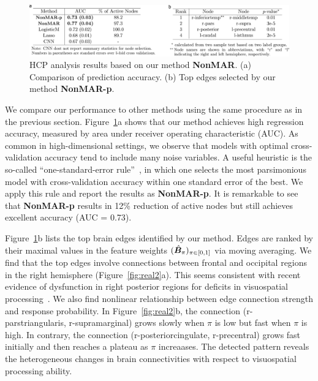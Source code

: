 \documentclass[11pt]{article}
\theoremstyle{plain}
\theoremstyle{definition}
\begin{document}
\begin{figure}[ht]
    \centering
       \includegraphics[width=\textwidth]{braintable.pdf}
 \caption{HCP analysis results based on our method {\bf \small NonMAR}. (a) Comparison of prediction accuracy. (b) Top edges selected by our method {\small \bf NonMAR-p}. }\label{fig:real}
\end{figure}

We compare our performance to other methods using the same procedure as in the previous section. Figure~\ref{fig:real}a shows that our method achieves high regression accuracy, measured by area under receiver operating characteristic (AUC). As common in high-dimensional settings, we observe that models with optimal cross-validation accuracy tend to include many noise variables. A useful heuristic is the so-called ``one-standard-error rule''~\citep{hastie2015statistical}, in which one selects the most parsimonious model with cross-validation accuracy within one standard error of the best. We apply this rule and report the results as {\bf \small NonMAR-p}. It is remarkable to see that {\bf \small NonMAR-p} results in 12\% reduction of active nodes but still achieves excellent accuracy (AUC = 0.73). 


Figure~\ref{fig:real}b lists the top brain edges identified by our method. Edges are ranked by their maximal values in the feature weights $(\hat {\bm B}_\pi)_{\pi \in [0,1]}$ via moving averaging. We find that the top edges involve connections between frontal and occipital regions in the right hemisphere (Figure~\ref{fig:real2}a). This seems consistent with recent evidence of dysfunction in right posterior regions for deficits in visuospatial processing~\citep{wang2019common}. We also find nonlinear relationship between edge connection strength and response probability. In Figure~\ref{fig:real2}b, the connection (r-parstriangularis, r-supramarginal) grows slowly when $\pi$ is low but fast when $\pi$ is high. In contrary, the connection (r-posteriorcingulate, r-precentral) grows fast initially and then reaches a plateau as $\pi$ increaases. The detected pattern reveals the heterogeneous changes in brain connectivities with respect to visuospatial processing ability. 
\end{document}
